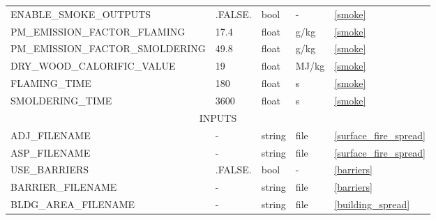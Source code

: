 \begin{landscape}
\begin{center}
\begin{longtable}{lllll}
ENABLE\_SMOKE\_OUTPUTS                       & .FALSE.                    & bool                   & -                                  & \ref{smoke}                          \\
PM\_EMISSION\_FACTOR\_FLAMING                & 17.4                       & float                  & g/kg                               & \ref{smoke}                          \\
PM\_EMISSION\_FACTOR\_SMOLDERING             & 49.8                       & float                  & g/kg                               & \ref{smoke}                          \\
DRY\_WOOD\_CALORIFIC\_VALUE                  & 19                         & float                  & MJ/kg                              & \ref{smoke}                          \\
FLAMING\_TIME                                & 180                        & float                  & s                                  & \ref{smoke}                          \\
SMOLDERING\_TIME                             & 3600                       & float                  & s                                  & \ref{smoke}                          \\
\multicolumn{5}{c}{INPUTS}                                                                                                                                                     \\
\toprule
ADJ\_FILENAME                                & -                          & string                 & file                               & \ref{surface_fire_spread}            \\
ASP\_FILENAME                                & -                          & string                 & file                               & \ref{surface_fire_spread}            \\
USE\_BARRIERS                                & .FALSE.                    & bool                   & -                                  & \ref{barriers}                       \\
BARRIER\_FILENAME                            & -                          & string                 & file                               & \ref{barriers}                       \\
BLDG\_AREA\_FILENAME                         & -                          & string                 & file                               & \ref{building_spread}                \\

\end{longtable}
\end{center}
\end{landscape}
